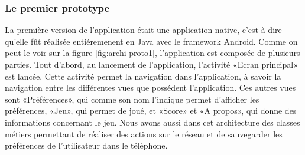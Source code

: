 \documentclass[a4paper,11pt,french]{article}
\def\android{Android\texttrademark{}}
\begin{document}
\subsubsection{Le premier prototype}

La première version de l'application était une application native, c'est-à-dire qu'elle fût réalisée entiéremenent en Java avec le framework \android{}. Comme on peut le voir sur la figure \ref{fig:archi-proto1}, l'application est composée de plusieurs parties. Tout d'abord, au lancement de l'application, l'activité «Ecran principal» est lancée. Cette activité permet la navigation dans l'application, à savoir la navigation entre les différentes vues que possédent l'application. Ces autres vues sont «Préférences», qui comme son nom l'indique permet d'afficher les préférences, «Jeu», qui permet de joué, et «Score» et «A propos», qui donne des informations concernant le jeu.
Nous avons aussi dans cet architecture des classes métiers permettant de réaliser des actions sur le réseau et de sauvegarder les préférences de l'utilisateur dans le téléphone.
\end{document}
